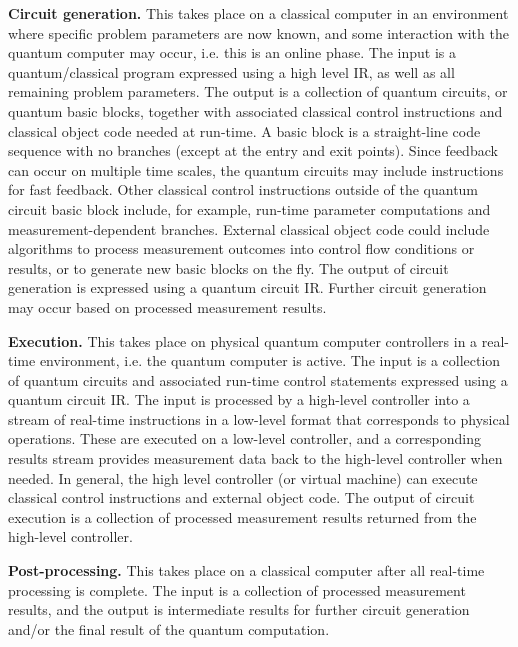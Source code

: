 \documentclass[USenglish,12pt,fleqn]{article} %
\begin{document}
{\bf Circuit generation.} This takes place on a classical computer in an environment where specific problem parameters are now known, and some interaction with the quantum computer may occur, i.e. this is an online phase. The input is a quantum/classical program expressed using a high level IR, as well as all remaining problem parameters. The output is a collection of quantum circuits, or quantum basic blocks, together with associated classical control instructions and classical object code needed at run-time. A basic block is a straight-line code sequence with no branches (except at the entry and exit points). Since feedback can occur on multiple time scales, the quantum circuits may include instructions for fast feedback. Other classical control instructions outside of the quantum circuit basic block include, for example, run-time parameter computations and measurement-dependent branches. External classical object code could include algorithms to process measurement outcomes into control flow conditions or results, or to generate new basic blocks on the fly. The output of circuit generation is expressed using a quantum circuit IR. Further circuit generation may occur based on processed measurement results.

{\bf Execution.} This takes place on physical quantum computer controllers in a real-time environment, i.e. the quantum computer is active. The input is a collection of quantum circuits and associated run-time control statements expressed using a quantum circuit IR. The input is processed by a high-level controller into a stream of real-time instructions in a low-level format that corresponds to physical operations. These are executed on a low-level controller, and a corresponding results stream provides measurement data back to the high-level controller when needed. In general, the high level controller (or virtual machine) can execute classical control instructions and external object code. The output of circuit execution is a collection of processed measurement results returned from the high-level controller.

{\bf Post-processing.} This takes place on a classical computer after all real-time processing is complete. The input is a collection of processed measurement results, and the output is intermediate results for further circuit generation and/or the final result of the quantum computation.
\end{document}
